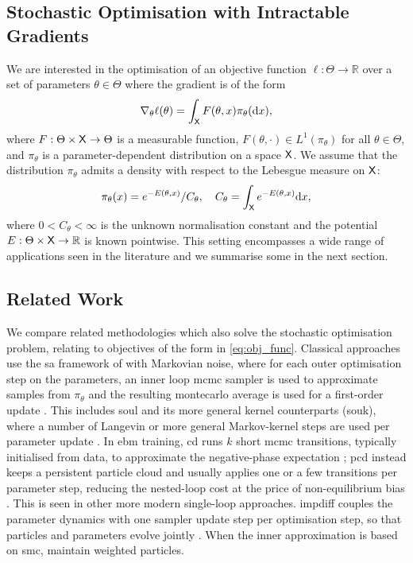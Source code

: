 \subsection{Stochastic Optimisation with Intractable Gradients}
We are interested in the optimisation of an objective function $\ell:\Theta\rightarrow\mathbb{R}$ over a set of parameters $\theta\in\Theta$ where the gradient is of the form
\begin{align}\label{eq:obj_func}
\nabla_\theta \ell(\theta) = \int_{\mathsf{X}} F(\theta, x)\pi_\theta(\mathrm{d} x),
\end{align}
where $F: \Theta\times{\mathsf{X}}\rightarrow \Theta$ is a measurable function, $F(\theta, \cdot) \in L^1(\pi_\theta)$ for all $\theta\in\Theta$, and $\pi_\theta$ is a parameter-dependent distribution on a space ${\mathsf{X}}$. We assume that the distribution $\pi_\theta$ admits a density with respect to the Lebesgue measure on ${\mathsf{X}}$:
\begin{equation}
    \pi_\theta(x)= e^{-E(\theta,x)}/C_\theta, \quad C_\theta=\int_{{\mathsf{X}}} e^{-E(\theta,x)}\mathrm{d} x,
\end{equation}
where $0 < C_\theta < \infty$ is the unknown normalisation constant and the potential $E:\Theta \times {\mathsf{X}} \to \mathbb R$ is known pointwise. This setting encompasses a wide range of applications seen in the literature and we summarise some in the next section.

\subsection{Related Work}\label{sec:related_work}

We compare related methodologies which also solve the stochastic optimisation problem, relating to objectives of the form in \eqref{eq:obj_func}. Classical approaches use the \gls*{sa} framework of \citet{robbins_monro_SA} with Markovian noise, where for each outer optimisation step on the parameters, an inner loop \gls*{mcmc} sampler is used to approximate samples from $\pi_\theta$ and the resulting \gls*{montecarlo} average is used for a first-order update \citep{younes1999convergence,andrieu2014markovian,atchade2017perturbed}. This includes \gls*{soul} and its more general kernel counterparts (\gls*{souk}), where a number of Langevin or more general Markov-kernel steps are used per parameter update \citep{de_bortoli_efficient_2021}. In \gls*{ebm} training, \gls*{cd} runs $k$ short \gls*{mcmc} transitions, typically initialised from data, to approximate the negative-phase expectation \citep{cd_original}; \gls*{pcd} instead keeps a persistent particle cloud and usually applies one or a few transitions per parameter step, reducing the nested-loop cost at the price of non-equilibrium bias \citep{tieleman2008training,oliva2025uniformintimeconvergenceboundspersistent}. This is seen in other more modern single-loop approaches. \gls*{impdiff} couples the parameter dynamics with one sampler update step per optimisation step, so that particles and parameters evolve jointly \citep{marion2025implicitdiffusionefficientoptimization}. When the inner approximation is based on \gls*{smc}, \citet{cuin2026efficientstochasticoptimisationsequential} maintain weighted particles.

